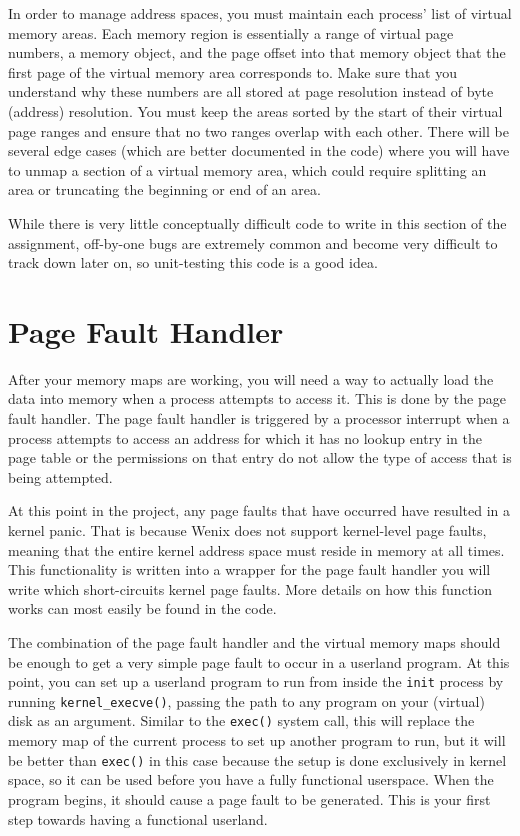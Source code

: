 In order to manage address spaces, you must maintain each process' list of virtual memory areas. Each memory region is essentially a range of virtual page numbers, a memory object, and the page offset into that memory object that the first page of the virtual memory area corresponds to. Make sure that you understand why these numbers are all stored at page resolution instead of byte (address) resolution. You must keep the areas sorted by the start of their virtual page ranges and ensure that no two ranges overlap with each other. There will be several edge cases (which are better documented in the code) where you will have to unmap a section of a virtual memory area, which could require splitting an area or truncating the beginning or end of an area.

While there is very little conceptually difficult code to write in this section of the assignment, off-by-one bugs are extremely common and become very difficult to track down later on, so unit-testing this code is a good idea.

\section{Page Fault Handler}

After your memory maps are working, you will need a way to actually load the data into memory when a process attempts to access it. This is done by the page fault handler. The page fault handler is triggered by a processor interrupt when a process attempts to access an address for which it has no lookup entry in the page table or the permissions on that entry do not allow the type of access that is being attempted.

At this point in the project, any page faults that have occurred have resulted in a kernel panic. That is because Wenix does not support kernel-level page faults, meaning that the entire kernel address space must reside in memory at all times. This functionality is written into a wrapper for the page fault handler you will write which short-circuits kernel page faults. More details on how this function works can most easily be found in the code.

The combination of the page fault handler and the virtual memory maps should be enough to get a very simple page fault to occur in a userland program. At this point, you can set up a userland program to run from inside the \texttt{init} process by running \texttt{kernel\_execve()}, passing the path to any program on your (virtual) disk as an argument. Similar to the \texttt{exec()} system call, this will replace the memory map of the current process to set up another program to run, but it will be better than \texttt{exec()} in this case because the setup is done exclusively in kernel space, so it can be used before you have a fully functional userspace. When the program begins, it should cause a page fault to be generated. This is your first step towards having a functional userland.

